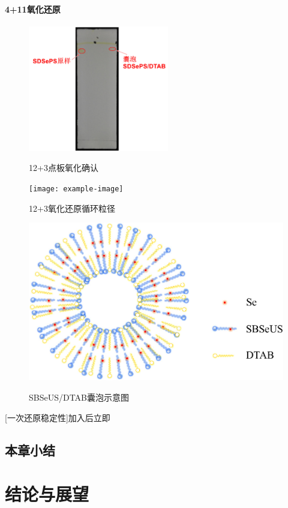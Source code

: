 \documentclass[bachelor,fandolfonts,replaceperiod]{jnuthesis}
\begin{document}
    \subsubsection{4+11氧化还原}
    \begin{figure}[htbp]
        \centering
        \includegraphics[height=5.5cm]{figure/SDSePS-Ox-tlc}\\
        \caption{12+3点板氧化确认}\label{figSDSePS-Ox-tlc:}
    \end{figure}
    
    \begin{figure}[htbp]
        \centering
        \texttt{[image: example-image]}\\
        \caption{12+3氧化还原循环粒径}\label{fig:}
    \end{figure}
    
    \begin{figure}[htbp]
        \centering
        \includegraphics[width=0.46\linewidth]{figure/vesicle-scheme.pdf}\\
        \caption{SBSeUS/DTAB囊泡示意图}\label{fig:vesicle-scheme}
    \end{figure}
    [一次还原稳定性]加入后立即
    
    \section{本章小结}

    \chapter{结论与展望}\label{chapter:concludes}
\end{document}

